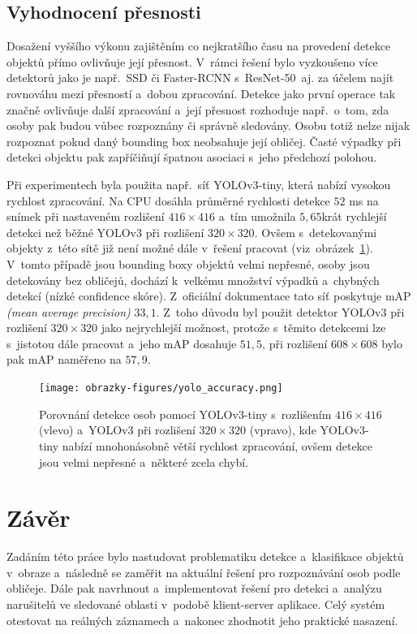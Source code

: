 \section{Vyhodnocení přesnosti}
Dosažení vyššího výkonu zajištěním co nejkratšího času na provedení detekce objektů přímo ovlivňuje její přesnost. V~rámci řešení bylo vyzkoušeno více detektorů jako je např.~SSD či Faster-RCNN s~ResNet-50~aj. za účelem najít rovnováhu mezi přesností a~dobou zpracování. Detekce jako první operace tak značně ovlivňuje další zpracování a~její přesnost rozhoduje např.~o~tom, zda osoby pak budou vůbec rozpoznány či správně sledovány. Osobu totiž nelze nijak rozpoznat pokud daný bounding box neobsahuje její obličej. Časté výpadky při detekci objektu pak zapříčiňují špatnou asociaci s~jeho předchozí polohou.

Při experimentech byla použita např.~síť YOLOv3-tiny, která nabízí vysokou rychlost zpracování. Na CPU dosáhla průměrné rychlosti detekce $52$ ms na snímek při nastaveném rozlišení $416 \times 416$ a~tím umožnila $5,65$krát rychlejší detekci než běžné YOLOv3 při rozlišení $320\times320$. Ovšem s~detekovanými objekty z~této sítě již není možné dále v~řešení pracovat (viz~obrázek~\ref{img:accuracy}). V~tomto případě jsou bounding boxy objektů velmi nepřesné, osoby jsou detekovány bez obličejů, dochází k~velkému množství výpadků a~chybných detekcí (nízké confidence skóre). Z~oficiální dokumentace tato síť poskytuje mAP \emph{(mean average precision)} $33,1$. Z~toho důvodu byl použit detektor YOLOv3 při rozlišení $320\times320$ jako nejrychlejší možnost, protože s~těmito detekcemi lze s~jistotou dále pracovat a~jeho mAP dosahuje $51,5$, při rozlišení $608 \times 608$ bylo pak mAP naměřeno na $57,9$.

\begin{figure}[hbt]
	\centering
	\setlength{\fboxsep}{0pt}
	\texttt{[image: obrazky-figures/yolo\_accuracy.png]}
	\caption{Porovnání detekce osob pomocí YOLOv3-tiny s~rozlišením $416 \times 416$ (vlevo) a~YOLOv3 při rozlišení $320\times320$ (vpravo), kde YOLOv3-tiny nabízí mnohonásobně větší rychlost zpracování, ovšem detekce jsou velmi nepřesné a~některé zcela chybí.}
	\label{img:accuracy}
\end{figure}


\chapter{Závěr}
Zadáním této práce bylo nastudovat problematiku detekce a~klasifikace objektů v~obraze a~následně se zaměřit na aktuální řešení pro rozpoznávání osob podle obličeje. Dále pak navrhnout a~implementovat řešení pro detekci a~analýzu narušitelů ve sledované oblasti v~podobě klient-server aplikace. Celý systém otestovat na reálných záznamech a~nakonec zhodnotit jeho praktické nasazení.

